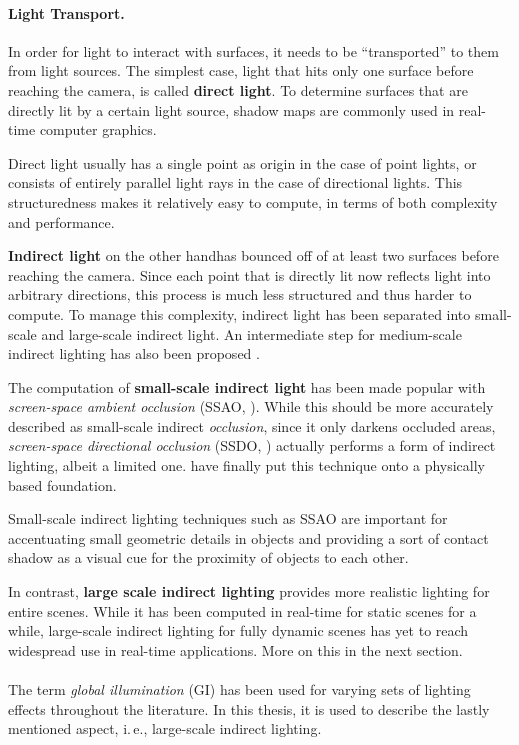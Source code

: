 \paragraph{Light Transport.}

In order for light to interact with surfaces, it needs to be ``transported'' to them from light sources. The simplest case, light that hits only one surface before reaching the camera, is called \textbf{direct light}. To determine surfaces that are directly lit by a certain light source, shadow maps are commonly used in real-time computer graphics.

Direct light usually has a single point as origin in the case of point lights, or consists of entirely parallel light rays in the case of directional lights. This structuredness makes it relatively easy to compute, in terms of both complexity and performance.

\textbf{Indirect light} on the other handhas bounced off of at least two surfaces before reaching the camera. Since each point that is directly lit now reflects light into arbitrary directions, this process is much less structured and thus harder to compute. To manage this complexity, indirect light has been separated into small-scale and large-scale indirect light. An intermediate step for medium-scale indirect lighting has also been proposed \citep{reed:2012:mediumAO}.

The computation of \textbf{small-scale indirect light} has been made popular with \textit{screen-space ambient occlusion} (SSAO, \cite{Mittring:2007:Cryengine2}). While this should be more accurately described as small-scale indirect \textit{occlusion}, since it only darkens occluded areas, \textit{screen-space directional occlusion} (SSDO, \cite{Ritschel:2009:SSDO}) actually performs a form of indirect lighting, albeit a limited one. \citet{jimenez:2016:AO} have finally put this technique onto a physically based foundation.

Small-scale indirect lighting techniques such as SSAO are important for accentuating small geometric details in objects and providing a sort of contact shadow as a visual cue for the proximity of objects to each other.

In contrast, \textbf{large scale indirect lighting} provides more realistic lighting for entire scenes. While it has been computed in real-time for static scenes for a while, large-scale indirect lighting for fully dynamic scenes has yet to reach widespread use in real-time applications. More on this in the next section.
\\
\\
The term \textit{global illumination} (GI) has been used for varying sets of lighting effects throughout the literature. In this thesis, it is used to describe the lastly mentioned aspect, i.\,e., large-scale indirect lighting.



